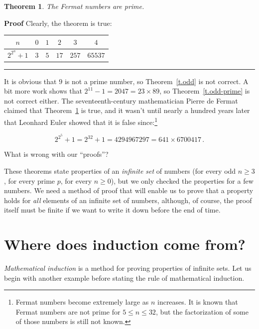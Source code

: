 \documentclass[11pt,a4paper]{report}
\newcommand*{\qed}{\hfill\rule{1ex}{1.5ex}}
\newcommand*{\qedd}[1]{\vspace*{-#1ex}\qed}
\newtheorem{theorem}{Theorem}
\begin{document}
\vspace*{-3ex}

\begin{theorem}\label{t.fermat}
The Fermat numbers are prime.
\end{theorem}

\textbf{Proof} 
Clearly, the theorem is true:
\begin{center}
\renewcommand{\arraystretch}{1.3}
\begin{tabular}{|c|c|c|c|c|c|}
\hline
$n$ & $0$ & $1$ & $2$ & $3$ & $4$ \\\hline
$2^{2^{n}}+1$ & $3$ & $5$ & $17$ & $257$ & $65537$ \\\hline
\end{tabular}
\end{center}

\qedd{4}

It is obvious that $9$ is not a prime number, so Theorem~\ref{t.odd} is not correct. A bit more work shows that $2^{11}-1=2047=23\times 89$, so Theorem~\ref{t.odd-prime} is not correct either. The seventeenth-century mathematician Pierre de Fermat claimed that Theorem~\ref{t.fermat} is true, and it wasn't until nearly a hundred years later that Leonhard Euler showed that it is false since:\footnote{Fermat numbers become extremely large as $n$ increases. It is known that Fermat numbers are not prime for $5\leq n \leq 32$, but the factorization of some of those numbers is still not known.}

\[2^{2^5}+1 = 2^{32}+1 = 4294967297 = 641 \times 6700417\,.\]

What is wrong with our ``proofs''?

These theorems state properties of an \emph{infinite set} of numbers (for every odd $n\geq 3$, for every prime $p$, for every $n\geq 0$), but we only checked the properties for a few numbers. We need a method of proof that will enable us to prove that a property holds for \emph{all} elements of an infinite set of numbers, although, of course, the proof itself must be finite if we want to write it down before the end of time.

\section{Where does induction come from?}\label{s.where}

\emph{Mathematical induction} is a method for proving properties of infinite sets. Let us begin with another example before stating the rule of mathematical induction.
\end{document}
